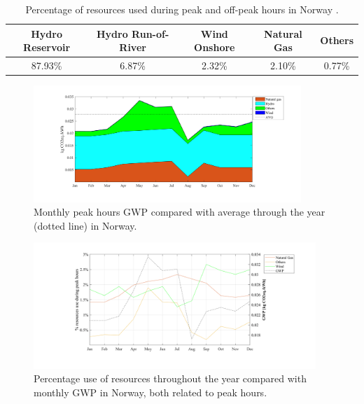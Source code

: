 { \begin{table}[]
\centering
\caption{Percentage of resources used during peak and off-peak hours in Norway \cite{Entso-eProduction}.}
\label{RES_NO} 
\begin{tabular}{ccccc}
\toprule
\textbf{Hydro Reservoir} & \textbf{Hydro Run-of-River} & \textbf{Wind Onshore} &  \textbf{Natural Gas}   & \textbf{Others}  \\ \hline
87.93\%                & 6.87\%  & 2.32\% &2.10\%                     &                  0.77\%                         \\ \bottomrule
\end{tabular}
\end{table}


\begin{figure}[]
	\centering
	\includegraphics[width=0.9\textwidth]{ChapterLCA/Images/GWP_plots/Norway_GWP.png}
	\vspace*{-8mm}
	\caption{Monthly peak hours GWP compared with average through the year (dotted line) in Norway.}
	\label{GWP_NO}
\end{figure}
\vspace*{-5mm}
\begin{figure}[]
	\centering
	\includegraphics[width=0.95\textwidth]{ChapterLCA/Images/GWP_plots/Comp_GWP_NO.png}
    \vspace*{-8mm}
	\caption{Percentage use of resources throughout the year compared with monthly GWP in Norway, both related to peak hours.}
	\label{COMP_NO}
\end{figure}

}
